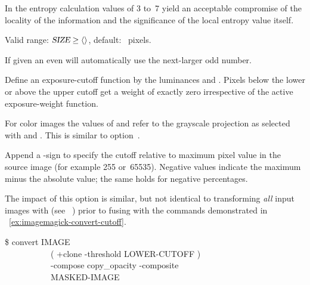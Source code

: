 \begin{codelist}
  In the entropy calculation  values of 3 to~7 yield an acceptable compromise of
  the locality of the information and the significance of the local entropy value itself.

  Valid range: $\metavar{SIZE} \geq \val{val:minimum-entropy-window-size}$, default:
  ~pixels.

  If given an even  \App{} will automatically use the next-larger odd number.


  \label{opt:exposure-cutoff}%
\item[\itempar{--exposure-cutoff=\metalowercutoff\optional{:\feasiblebreak
      \metavar{UPPER\hyp{}CUTOFF}\optional{:\feasiblebreak
        \metalowerprojector:\feasiblebreak
        \metaupperprojector}}}]\itemend
  Define an exposure-cutoff function by the luminances \metalowercutoff{} and \metauppercutoff.
  Pixels below the lower or above the upper cutoff get a weight of exactly zero irrespective of
  the active exposure-weight function.

  For color images the values of \metalowercutoff{} and \metauppercutoff{} refer to the
  grayscale projection as selected with \metalowerprojector{} and \metaupperprojector.  This is
  similar to option~.

  Append a \sample{\%}-sign to specify the cutoff relative to maximum pixel value in the source
  image (for example 255 or~65535).  Negative \metauppercutoff{} values indicate the maximum
  minus the absolute \metauppercutoff{} value; the same holds for negative percentages.

  \begin{geeknote}
    The impact of this option is similar, but not identical to transforming \emph{all} input
    images with 
     (see \appendixName~) prior
    to fusing with the commands demonstrated in
    \exampleName~\ref{ex:imagemagick-convert-cutoff}.

    \begin{exemplar}
      \begin{terminal}
        \$ convert IMAGE \bslash \\
        ~~~~~~~~~~~\bslash( +clone -threshold LOWER-CUTOFF \bslash) \bslash \\
        ~~~~~~~~~~~-compose copy\_opacity -composite \bslash \\
        ~~~~~~~~~~~MASKED-IMAGE
      \end{terminal}


\end{exemplar}
\end{geeknote}
\end{codelist}
